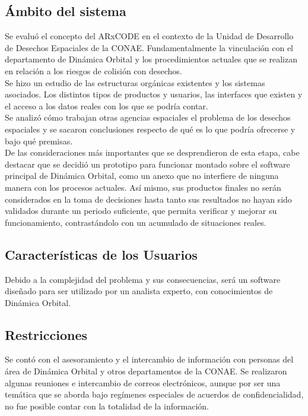\subsection{Ámbito del sistema}
Se evalu\'o  el concepto del ARxCODE en el contexto de la Unidad de Desarrollo de Desechos Espaciales de la CONAE. Fundamentalmente la vinculaci\'on con el departamento de Din\'amica Orbital y los procedimientos actuales que se realizan en relaci\'on a los riesgos de colisi\'on con desechos.\\

Se hizo un estudio de las estructuras org\'anicas existentes y los sistemas asociados. Los distintos tipos de productos y usuarios, las interfaces que existen y el acceso a los datos reales con los que se  podr\'ia contar.\\

Se analiz\'o c\'omo trabajan otras agencias espaciales el problema de los desechos espaciales y se sacaron conclusiones respecto de qu\'e es lo que podr\'ia ofrecerse y bajo qu\'e premisas.\\

De las consideraciones m\'as importantes que se desprendieron de esta etapa, cabe destacar que se decidi\'o un prototipo para funcionar montado sobre el software principal de Din\'amica Orbital, como un anexo que no interfiere de ninguna manera con los procesos actuales. Así mismo, sus productos finales no ser\'an considerados en la toma de decisiones hasta tanto sus resultados no hayan sido validados durante un periodo suficiente, que permita verificar y mejorar su funcionamiento, contrast\'andolo con un acumulado de situaciones reales.\\

\subsection{Caracter\'isticas de los Usuarios}
Debido a la complejidad del problema y sus consecuencias, ser\'a un software diseñado para ser utilizado por un analista experto, con conocimientos de Din\'amica Orbital.\\

\subsection{Restricciones}
Se cont\'o con el asesoramiento y el intercambio de informaci\'on con personas del \'area de Din\'amica Orbital y otros departamentos de la CONAE. Se realizaron algunas reuniones e intercambio de correos electr\'onicos, aunque por ser una tem\'atica que se aborda bajo reg\'imenes especiales de acuerdos de confidencialidad, no fue posible contar con la totalidad de la informaci\'on.\\

